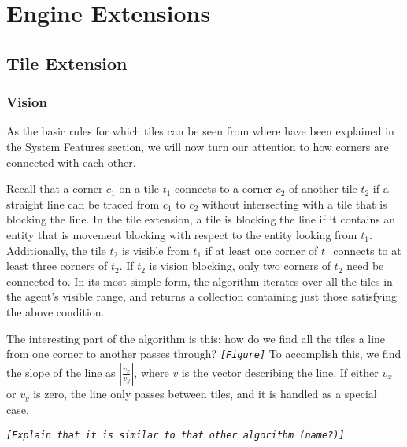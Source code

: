 
\section{Engine Extensions}


\subsection{Tile Extension}


\subsubsection*{Vision}

As the basic rules for which tiles can be seen from where have been
explained in the System Features section, we will now turn our attention
to how corners are connected with each other. 

Recall that a corner $c_{1}$ on a tile $t_{1}$ connects to a corner
$c_{2}$ of another tile $t_{2}$ if a straight line can be traced
from $c_{1}$ to $c_{2}$ without intersecting with a tile that is
blocking the line. In the tile extension, a tile is blocking the line
if it contains an entity that is movement blocking with respect to
the entity looking from $t_{1}$. Additionally, the tile $t_{2}$
is visible from $t_{1}$ if at least one corner of $t_{1}$ connects
to at least three corners of $t_{2}$. If $t_{2}$ is vision blocking,
only two corners of $t_{2}$ need be connected to. In its most simple
form, the algorithm iterates over all the tiles in the agent's visible
range, and returns a collection containing just those satisfying the
above condition. 

The interesting part of the algorithm is this: how do we find all
the tiles a line from one corner to another passes through? \texttt{\emph{{[}Figure{]}}}
To accomplish this, we find the slope of the line as $\left|\frac{v_{x}}{v_{y}}\right|$,
where $v$ is the vector describing the line. If either $v_{x}$ or
$v_{y}$ is zero, the line only passes between tiles, and it is handled
as a special case.

\texttt{\emph{{[}Explain that it is similar to that other algorithm
(name?){]}}}
